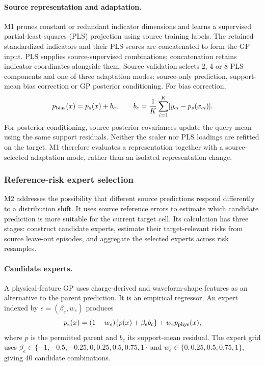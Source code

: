 \documentclass[preprint,12pt]{elsarticle}
\begin{document}
\paragraph{Source representation and adaptation.}
M1 prunes constant or redundant indicator dimensions and learns a supervised partial-least-squares (PLS) projection using source training labels. The retained standardized indicators and their PLS scores are concatenated to form the GP input. PLS supplies source-supervised combinations; concatenation retains indicator coordinates alongside them. Source validation selects 2, 4 or 8 PLS components and one of three adaptation modes: source-only prediction, support-mean bias correction or GP posterior conditioning. For bias correction,
\begin{equation}
p_{\rm bias}(x)=p_s(x)+b_c,\qquad b_c=\frac{1}{K}\sum_{i=1}^K[y_{ci}-p_s(x_{ci})].
\end{equation}
For posterior conditioning, source-posterior covariances update the query mean using the same support residuals. Neither the scaler nor PLS loadings are refitted on the target. M1 therefore evaluates a representation together with a source-selected adaptation mode, rather than an isolated representation change.

\subsubsection{Reference-risk expert selection}
M2 addresses the possibility that different source predictions respond differently to a distribution shift. It uses source reference errors to estimate which candidate prediction is more suitable for the current target cell. Its calculation has three stages: construct candidate experts, estimate their target-relevant risks from source leave-out episodes, and aggregate the selected experts across risk resamples.

\paragraph{Candidate experts.} A physical-feature GP uses charge-derived and waveform-shape features as an alternative to the parent prediction. It is an empirical regressor. An expert indexed by $e=(\beta_e,w_e)$ produces
\begin{equation}
p_e(x)=(1-w_e)\{p(x)+\beta_e b_c\}+w_e p_{\rm phys}(x),
\end{equation}
where $p$ is the permitted parent and $b_c$ its support-mean residual. The expert grid uses $\beta_e\in\{-1,-0.5,-0.25,0,0.25,0.5,0.75,1\}$ and $w_e\in\{0,0.25,0.5,0.75,1\}$, giving 40 candidate combinations.
\end{document}
